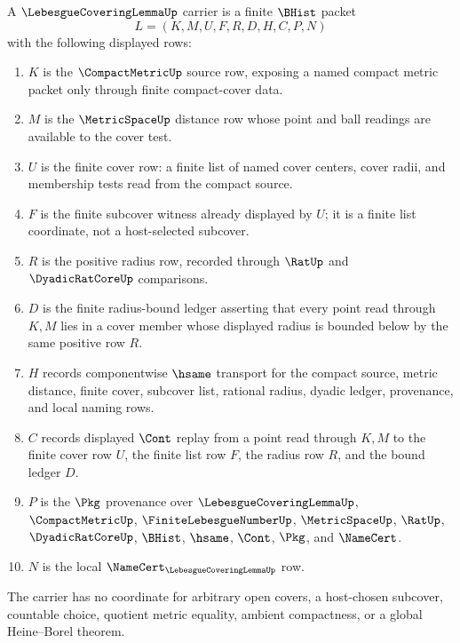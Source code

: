 \begin{definition}
\label{def:lebesgue-covering-lemma-carrier}
A $\LebesgueCoveringLemmaUp$ carrier is a finite $\BHist$ packet
$$
L=(K,M,U,F,R,D,H,C,P,N)
$$
with the following displayed rows:
\begin{enumerate}
\item $K$ is the $\CompactMetricUp$ source row, exposing a named compact metric packet only through finite compact-cover data.
\item $M$ is the $\MetricSpaceUp$ distance row whose point and ball readings are available to the cover test.
\item $U$ is the finite cover row: a finite list of named cover centers, cover radii, and membership tests read from the compact source.
\item $F$ is the finite subcover witness already displayed by $U$; it is a finite list coordinate, not a host-selected subcover.
\item $R$ is the positive radius row, recorded through $\RatUp$ and $\DyadicRatCoreUp$ comparisons.
\item $D$ is the finite radius-bound ledger asserting that every point read through $K,M$ lies in a cover member whose displayed radius is bounded below by the same positive row $R$.
\item $H$ records componentwise $\hsame$ transport for the compact source, metric distance, finite cover, subcover list, rational radius, dyadic ledger, provenance, and local naming rows.
\item $C$ records displayed $\Cont$ replay from a point read through $K,M$ to the finite cover row $U$, the finite list row $F$, the radius row $R$, and the bound ledger $D$.
\item $P$ is the $\Pkg$ provenance over $\LebesgueCoveringLemmaUp$, $\CompactMetricUp$, $\FiniteLebesgueNumberUp$, $\MetricSpaceUp$, $\RatUp$, $\DyadicRatCoreUp$, $\BHist$, $\hsame$, $\Cont$, $\Pkg$, and $\NameCert$.
\item $N$ is the local $\NameCert_{\LebesgueCoveringLemmaUp}$ row.
\end{enumerate}
The carrier has no coordinate for arbitrary open covers, a host-chosen subcover, countable choice, quotient metric equality, ambient compactness, or a global Heine--Borel theorem.
\end{definition}

